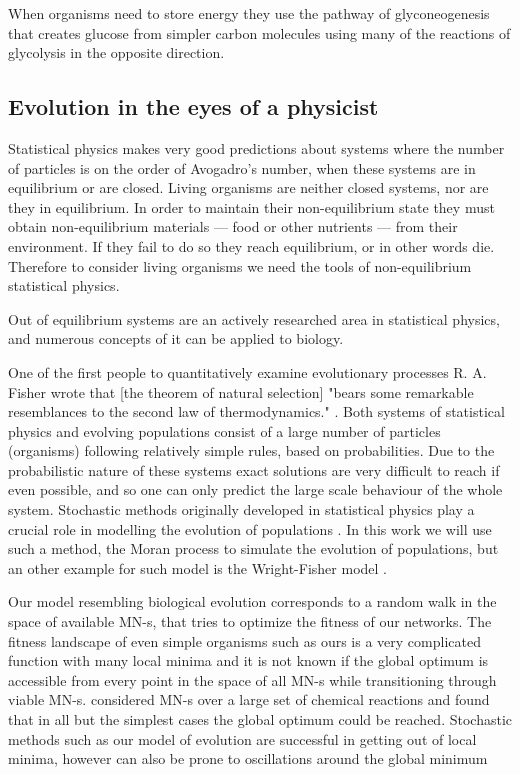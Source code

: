 \documentclass[a4paper,12pt]{article}
\begin{document}
When organisms need to store energy they use the pathway of glyconeogenesis that creates glucose from simpler carbon molecules using many of the reactions of glycolysis in the opposite direction. %
	\subsection{Evolution in the eyes of a physicist}\label{chap:whereisphysics}

	Statistical physics makes very good predictions about systems where the number of particles is on the order of Avogadro's number, when these systems are in equilibrium or are closed. Living organisms are neither closed systems, nor are they in equilibrium. In order to maintain their non-equilibrium state they must obtain non-equilibrium materials --- food or other nutrients --- from their environment. If they fail to do so they reach equilibrium, or in other words die. \cite{irreversibility} Therefore to consider living organisms we need the tools of non-equilibrium statistical physics. 

	Out of equilibrium systems are an actively researched area in statistical physics, and numerous concepts of it can be applied to biology. 
	
	One of the first people to quantitatively examine evolutionary processes R. A. Fisher wrote that [the theorem of natural selection] "bears some remarkable resemblances to the second law of thermodynamics." \cite{fisherevolution}. Both systems of statistical physics and evolving populations consist of a large number of particles (organisms) following relatively simple rules, based on probabilities. Due to the probabilistic nature of these systems exact solutions are very difficult to reach if even possible, and so one can only predict the large scale behaviour of the whole system. Stochastic methods originally developed in statistical physics play a crucial role in modelling the evolution of populations \cite{stochasticblythe}. In this work we will use such a method, the Moran process \cite{moranprocess} to simulate the evolution of populations, but an other example for such model is the Wright-Fisher model \cite{mathematicalpopgen}.

	Our model resembling biological evolution corresponds to a random walk in the space of available MN-s, that tries to optimize the fitness of our networks. The fitness landscape of even simple organisms such as ours is a very complicated function with many local minima and it is not known if the global optimum is accessible from every point in the space of all MN-s while transitioning through viable MN-s. \cite{historical} considered MN-s over a large set of chemical reactions and found that in all but the simplest cases the global optimum could be reached. Stochastic methods such as our model of evolution are successful in getting out of local minima, however can also be prone to oscillations around the global minimum 
\end{document}
